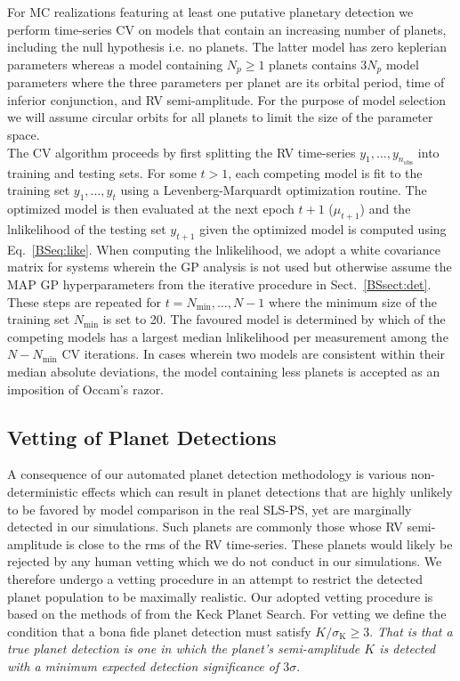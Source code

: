 For MC realizations featuring at least one putative planetary detection
we perform time-series CV 
on models that contain an increasing number of planets, including the null hypothesis i.e. no planets.
The latter model has zero keplerian parameters whereas a model containing $N_p \ge 1$ planets
contains $3N_p$ model parameters where the three parameters per planet are its orbital period,
time of inferior conjunction, and RV semi-amplitude. For the purpose of model selection we
will assume circular orbits for all planets to limit the size of the parameter space. \\

The CV algorithm proceeds by first splitting the RV time-series $y_1,\dots,y_{n_{\text{obs}}}$ into training and
testing sets. For some $t>1$, each competing model is fit to the training set
$y_1,\dots,y_t$ using a Levenberg-Marquardt optimization routine. The optimized model is then evaluated
at the next epoch $t+1$ ($\mu_{t+1}$) and the lnlikelihood of the testing set $y_{t+1}$ given the optimized
model is computed
using Eq.~\ref{BSeq:like}. When computing the lnlikelihood, we adopt a white covariance matrix for systems
wherein the GP analysis is not used but otherwise assume the MAP GP hyperparameters from the
iterative procedure in Sect.~\ref{BSsect:det}. These steps are repeated for
$t=N_{\text{min}},\dots,N-1$ where the minimum size of the training set $N_{\text{min}}$ is set to 20. 
The favoured model is determined by which of the competing models has a largest median lnlikelihood per
measurement among the $N-N_{\text{min}}$ CV iterations. In cases wherein two models are consistent
within their median absolute deviations, the model containing less planets is accepted as an imposition of
Occam's razor. \\


\subsection{Vetting of Planet Detections} \label{BSsect:vett}
A consequence of our automated planet detection methodology is
various non-deterministic effects which can result in planet detections that are highly unlikely to be
favored by model comparison in the real SLS-PS, yet are marginally detected in our simulations.
Such planets are commonly those whose RV semi-amplitude is
close to the rms of the RV time-series. These planets would likely be rejected by any human
vetting which we do not conduct in our simulations. We therefore undergo a vetting procedure in an
attempt to restrict the detected planet population to be maximally realistic. Our adopted vetting procedure
is based on the methods of \cite{cumming08} from the Keck Planet Search. For vetting we define 
the condition that a bona fide planet detection must satisfy $K/\sigma_{\text{K}} \ge 3$. \emph{That is
  that a true planet detection is one in which the planet's semi-amplitude $K$ is detected with a minimum
  expected detection significance of $3\sigma$}. \\

